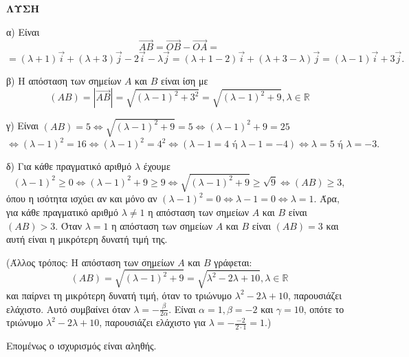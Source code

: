 \textbf{ΛΥΣΗ}
\medskip

α) Είναι
\[ \vec{AB} = \vec{OB} - \vec{OA} = \]
\[ = (\lambda + 1)\vec{i} + (\lambda + 3)\vec{j} - 2\vec{i} - \lambda\vec{j} = (\lambda + 1 - 2)\vec{i} + (\lambda + 3 - \lambda)\vec{j} = (\lambda - 1)\vec{i} + 3\vec{j}. \]

β) Η απόσταση των σημείων $A$ και $B$ είναι ίση με
\[ (AB) = |\vec{AB}| = \sqrt{(\lambda - 1)^2 + 3^2} = \sqrt{(\lambda - 1)^2 + 9}, \lambda \in \mathbb{R} \]

γ) Είναι $(AB) = 5 \Leftrightarrow \sqrt{(\lambda - 1)^2 + 9} = 5 \Leftrightarrow (\lambda - 1)^2 + 9 = 25$
\[ \Leftrightarrow (\lambda - 1)^2 = 16 \Leftrightarrow (\lambda - 1)^2 = 4^2 \Leftrightarrow (\lambda - 1 = 4 \text{ ή } \lambda - 1 = -4) \Leftrightarrow \lambda = 5 \text{ ή } \lambda = -3. \]

δ) Για κάθε πραγματικό αριθμό $\lambda$ έχουμε
\[ (\lambda - 1)^2 \geq 0 \Leftrightarrow (\lambda - 1)^2 + 9 \geq 9 \Leftrightarrow \sqrt{(\lambda - 1)^2 + 9} \geq \sqrt{9} \Leftrightarrow (AB) \geq 3, \]
όπου η ισότητα ισχύει αν και μόνο αν $(\lambda - 1)^2 = 0 \Leftrightarrow \lambda - 1 = 0 \Leftrightarrow \lambda = 1.$
Άρα, για κάθε πραγματικό αριθμό $\lambda \neq 1$ η απόσταση των σημείων $A$ και $B$ είναι $(AB) > 3.$
Όταν $\lambda = 1$ η απόσταση των σημείων $A$ και $B$ είναι $(AB) = 3$ και αυτή είναι η μικρότερη δυνατή τιμή της.

\medskip
(Άλλος τρόπος: Η απόσταση των σημείων $A$ και $B$ γράφεται:
\[ (AB) = \sqrt{(\lambda - 1)^2 + 9} = \sqrt{\lambda^2 - 2\lambda + 10}, \lambda \in \mathbb{R} \]
και παίρνει τη μικρότερη δυνατή τιμή, όταν το τριώνυμο $\lambda^2 - 2\lambda + 10$, παρουσιάζει ελάχιστο.
Αυτό συμβαίνει όταν $\lambda = -\frac{\beta}{2\alpha}$. Είναι $\alpha = 1, \beta = -2$ και $\gamma = 10$, οπότε το τριώνυμο
$\lambda^2 - 2\lambda + 10$, παρουσιάζει ελάχιστο για $\lambda = -\frac{-2}{2 \cdot 1} = 1.$)

\medskip
Επομένως ο ισχυρισμός είναι αληθής.
\endlysh